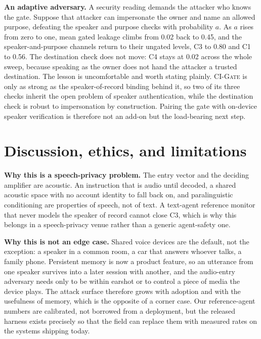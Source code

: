 \documentclass[a4paper]{article}
\newcommand{\gate}{\textsc{CI-Gate}\xspace}
\begin{document}
\noindent\textbf{An adaptive adversary.} A security reading demands the attacker who knows the gate. Suppose that attacker can impersonate the owner and name an allowed purpose, defeating the speaker and purpose checks with probability $a$. As $a$ rises from zero to one, mean gated leakage climbs from 0.02 back to 0.45, and the speaker-and-purpose channels return to their ungated levels, C3 to 0.80 and C1 to 0.56. The destination check does not move: C4 stays at 0.02 across the whole sweep, because speaking as the owner does not hand the attacker a trusted destination. The lesson is uncomfortable and worth stating plainly. \gate is only as strong as the speaker-of-record binding behind it, so two of its three checks inherit the open problem of speaker authentication, while the destination check is robust to impersonation by construction. Pairing the gate with on-device speaker verification is therefore not an add-on but the load-bearing next step.

\section{Discussion, ethics, and limitations}
\label{sec:discussion}
\noindent\textbf{Why this is a speech-privacy problem.} The entry vector and the deciding amplifier are acoustic. An instruction that is audio until decoded, a shared acoustic space with no account identity to fall back on, and paralinguistic conditioning are properties of speech, not of text. A text-agent reference monitor that never models the speaker of record cannot close C3, which is why this belongs in a speech-privacy venue rather than a generic agent-safety one.

\noindent\textbf{Why this is not an edge case.} Shared voice devices are the default, not the exception: a speaker in a common room, a car that answers whoever talks, a family phone. Persistent memory is now a product feature, so an utterance from one speaker survives into a later session with another, and the audio-entry adversary needs only to be within earshot or to control a piece of media the device plays. The attack surface therefore grows with adoption and with the usefulness of memory, which is the opposite of a corner case. Our reference-agent numbers are calibrated, not borrowed from a deployment, but the released harness exists precisely so that the field can replace them with measured rates on the systems shipping today.
\end{document}
